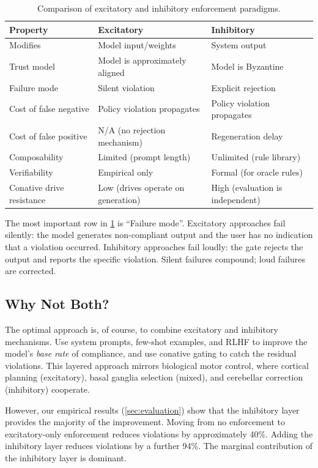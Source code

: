 \documentclass[11pt,a4paper]{article}
\begin{document}
\begin{table}[t]
\centering
\caption{Comparison of excitatory and inhibitory enforcement paradigms.}
\label{tab:paradigm-comparison}
\begin{tabular}{@{}lll@{}}
\toprule
\textbf{Property} & \textbf{Excitatory} & \textbf{Inhibitory} \\
\midrule
Modifies & Model input/weights & System output \\
Trust model & Model is approximately aligned & Model is Byzantine \\
Failure mode & Silent violation & Explicit rejection \\
Cost of false negative & Policy violation propagates & Policy violation propagates \\
Cost of false positive & N/A (no rejection mechanism) & Regeneration delay \\
Composability & Limited (prompt length) & Unlimited (rule library) \\
Verifiability & Empirical only & Formal (for oracle rules) \\
Conative drive resistance & Low (drives operate on generation) & High (evaluation is independent) \\
\bottomrule
\end{tabular}
\end{table}

The most important row in \cref{tab:paradigm-comparison} is
``Failure mode''.  Excitatory approaches fail silently: the model
generates non-compliant output and the user has no indication that
a violation occurred.  Inhibitory approaches fail loudly: the gate
rejects the output and reports the specific violation.  Silent
failures compound; loud failures are corrected.

\subsection{Why Not Both?}

The optimal approach is, of course, to combine excitatory and
inhibitory mechanisms.  Use system prompts, few-shot examples, and
RLHF to improve the model's \emph{base rate} of compliance, and
use conative gating to catch the residual violations.  This layered
approach mirrors biological motor control, where cortical planning
(excitatory), basal ganglia selection (mixed), and cerebellar
correction (inhibitory) cooperate.

However, our empirical results (\cref{sec:evaluation}) show that
the inhibitory layer provides the majority of the improvement.
Moving from no enforcement to excitatory-only enforcement reduces
violations by approximately 40\%.  Adding the inhibitory layer
reduces violations by a further 94\%.  The marginal contribution
of the inhibitory layer is dominant.
\end{document}
